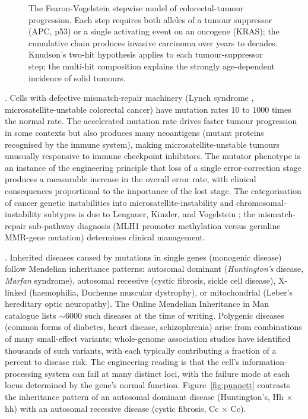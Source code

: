 \begin{figure}[h]
\centering

\caption{The Fearon-Vogelstein stepwise model of colorectal-tumour
progression. Each step requires both alleles of a tumour suppressor
(APC, p53) or a single activating event on an oncogene (KRAS); the
cumulative chain produces invasive carcinoma over years to decades.
Knudson's two-hit hypothesis applies to each tumour-suppressor step;
the multi-hit composition explains the strongly age-dependent
incidence of solid tumours.}
\label{fig:cancer-progression}
\end{figure}

. Cells
with defective mismatch-repair machinery (Lynch syndrome
\cite{paper:v6c03-lynch-1985}, microsatellite-unstable colorectal
cancer) have mutation rates $10$ to $1000$ times the normal rate. The
accelerated mutation rate drives faster tumour progression in some
contexts but also produces many neoantigens (mutant proteins
recognised by the immune system), making microsatellite-unstable
tumours unusually responsive to immune checkpoint inhibitors. The
mutator phenotype is an instance of the engineering principle that
loss of a single error-correction stage produces a measurable increase
in the overall error rate, with clinical consequences proportional to
the importance of the lost stage. The categorisation of cancer
genetic instabilities into microsatellite-instability and chromosomal-
instability subtypes is due to Lengauer, Kinzler, and Vogelstein
\cite{paper:v6c03-lengauer-kinzler-vogelstein-1998}; the
mismatch-repair sub-pathway diagnosis (MLH1 promoter methylation
versus germline MMR-gene mutation) determines clinical management.

. Inherited diseases caused by mutations
in single genes (monogenic disease) follow Mendelian inheritance
patterns: autosomal dominant (\emph{Huntington's} disease,
\emph{Marfan} syndrome), autosomal recessive (cystic fibrosis,
sickle cell disease), X-linked (haemophilia, Duchenne muscular
dystrophy), or mitochondrial (Leber's hereditary optic neuropathy).
The Online Mendelian Inheritance in Man catalogue
\cite{web:v6c03-omim-2024} lists $\sim 6000$ such diseases at the time
of writing. Polygenic diseases (common forms of diabetes, heart
disease, schizophrenia) arise from combinations of many small-effect
variants; whole-genome association studies have identified thousands
of such variants, with each typically contributing a fraction of a
percent to disease risk. The engineering reading is that the cell's
information-processing system can fail at many distinct loci, with
the failure mode at each locus determined by the gene's normal
function. Figure~\ref{fig:punnett} contrasts the inheritance pattern
of an autosomal dominant disease (Huntington's, Hh $\times$ hh) with
an autosomal recessive disease (cystic fibrosis, Cc $\times$ Cc).

